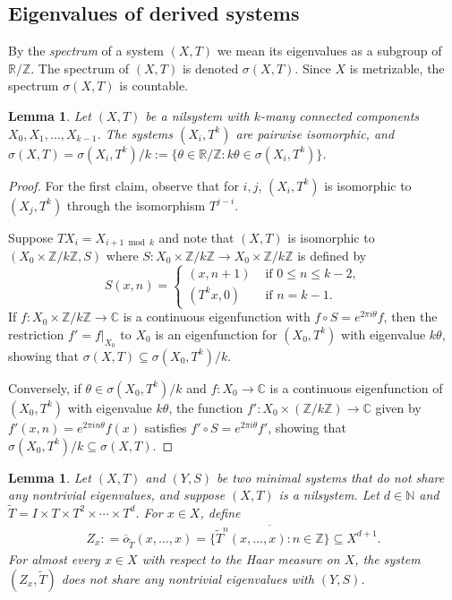 \documentclass{article}
\theoremstyle{plain}
\newtheorem{lemma}[Theorem]{Lemma}
\theoremstyle{claim}
\theoremstyle{definition}
\theoremstyle{plain}
\theoremstyle{plain}
\newcommand{\N}{\mathbb{N}}
\newcommand{\Z}{\mathbb{Z}}
\newcommand{\R}{\mathbb{R}}
\newcommand{\C}{\mathbb{C}}
\renewcommand{\leq}{\leqslant}
\newcommand{\1}{\boldsymbol{1}}
\begin{document}
\subsection{Eigenvalues of derived systems}



By the \emph{spectrum} of a system $(X,T)$ we mean its eigenvalues as a subgroup of $\R/\Z$.
The spectrum of $(X,T)$ is denoted $\sigma(X,T)$. 
Since $X$ is metrizable, the spectrum $\sigma(X, T)$ is countable.

\begin{lemma}
\label{lem:MEF_nilsystem_not_connected}
Let $(X, T)$ be a nilsystem with $k$-many connected components $X_0, X_1, \ldots, X_{k-1}$. The systems $(X_i, T^k)$ are pairwise isomorphic, and $\sigma(X, T) = \sigma(X_i, T^k)/k := \{\theta \in \R/\Z: k \theta \in \sigma(X_i, T^k)\}$.
\end{lemma}

\begin{proof}
For the first claim, observe that for $i, j$, $(X_i, T^k)$ is isomorphic to $(X_j, T^k)$ through the isomorphism $T^{j-i}$.

Suppose $T X_i = X_{i+1 \bmod k}$ and note that $(X, T)$ is isomorphic to $(X_0 \times \Z/k\Z, S)$ where $S: X_0 \times \Z/k\Z \to X_0 \times \Z/k\Z$ is defined by
\[
    S(x, n) = \begin{cases}
        (x, n + 1) & \text{ if } 0 \leq n \leq k - 2, \\
        (T^k x, 0) & \text{ if } n = k - 1.
    \end{cases}
\]
If $f:X_0\times\Z/k\Z\to\C$ is a continuous eigenfunction with $f \circ S = e^{2\pi i\theta} f$, then the restriction $f'=f|_{X_0}$ to $X_0$ is an eigenfunction for $(X_0,T^k)$ with eigenvalue $k\theta$, showing that $\sigma(X,T) \subseteq \sigma(X_0,T^k)/k$.

Conversely, if $\theta\in\sigma(X_0,T^k)/k$ and $f:X_0\to\C$ is a continuous eigenfunction of $(X_0,T^k)$ with eigenvalue $k\theta$, the function $f':X_0\times(\Z/k\Z)\to\C$ given by $f'(x,n)=e^{2\pi i n\theta}f(x)$ satisfies $f' \circ S = e^{2\pi i \theta}f'$, showing that $\sigma(X_0,T^k)/k \subseteq \sigma(X,T)$.
\end{proof}


\begin{lemma}\label{lem:same-mef}
    Let $(X, T)$ and $(Y,S)$ be two minimal systems that do not share any nontrivial eigenvalues, and suppose $(X,T)$ is a nilsystem.
    Let $d \in \N$ and $\tilde{T} = I \times T \times T^2 \times \cdots \times T^d$.
For $x \in X$, define
\begin{align}
\label{eqn_def_of_zx}
    Z_x : = \overline{o}_{\tilde{T}}(x,\ldots,x) = \overline{\{\tilde{T}^n(x, \ldots, x): n \in \Z\}} \subseteq X^{d+1}.
\end{align}
For almost every $x \in X$ with respect to the Haar measure on $X$, the system $(Z_x, \tilde{T})$ does not share any nontrivial eigenvalues with $(Y,S)$.
\end{lemma}
\end{document}
